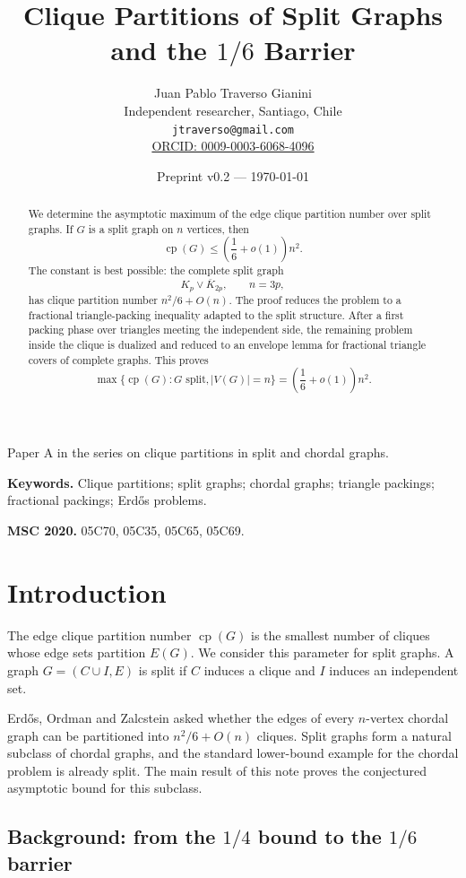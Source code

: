 \documentclass[11pt]{article}
\title{Clique Partitions of Split Graphs and the $1/6$ Barrier}
\author{
Juan Pablo Traverso Gianini\\
Independent researcher, Santiago, Chile\\
\texttt{jtraverso@gmail.com}\\
\href{https://orcid.org/0009-0003-6068-4096}{ORCID: 0009-0003-6068-4096}
}
\date{Preprint v0.2 --- \today}
\newcommand{\cp}{\operatorname{cp}}
\begin{document}
\maketitle

\begin{center}
{\small Paper A in the series on clique partitions in split and chordal graphs.}
\end{center}

\noindent\textbf{Keywords.}
Clique partitions; split graphs; chordal graphs; triangle packings; fractional packings; Erdős problems.

\medskip

\noindent\textbf{MSC 2020.}
05C70, 05C35, 05C65, 05C69.

\begin{abstract}
We determine the asymptotic maximum of the edge clique partition number over split graphs. If \(G\) is a split graph on \(n\) vertices, then
\[
    \cp(G)\le \left(\frac16+o(1)\right)n^2 .
\]
The constant is best possible: the complete split graph
\[
    K_p\vee\overline{K}_{2p}, \qquad n=3p,
\]
has clique partition number \(n^2/6+O(n)\). The proof reduces the problem to a fractional triangle-packing inequality adapted to the split structure. After a first packing phase over triangles meeting the independent side, the remaining problem inside the clique is dualized and reduced to an envelope lemma for fractional triangle covers of complete graphs. This proves
\[
    \max\{\cp(G):G\text{ split}, |V(G)|=n\}
    =
    \left(\frac16+o(1)\right)n^2.
\]
\end{abstract}

\section{Introduction}

The edge clique partition number \(\cp(G)\) is the smallest number of cliques whose edge sets partition \(E(G)\). We consider this parameter for split graphs. A graph \(G=(C\cup I,E)\) is split if \(C\) induces a clique and \(I\) induces an independent set.

Erdős, Ordman and Zalcstein asked whether the edges of every \(n\)-vertex chordal graph can be partitioned into \(n^2/6+O(n)\) cliques. Split graphs form a natural subclass of chordal graphs, and the standard lower-bound example for the chordal problem is already split. The main result of this note proves the conjectured asymptotic bound for this subclass.


\subsection*{Background: from the \(1/4\) bound to the \(1/6\) barrier}
\end{document}

